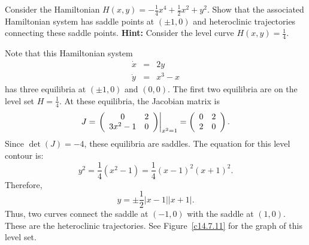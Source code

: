 \documentclass{ximera}
\begin{document}
\begin{exercise} \label{c14.7.11} 
Consider the Hamiltonian  $H(x,y) = -\frac{1}{4}x^4 + \frac{1}{2}x^2 + y^2$.  
Show that the associated Hamiltonian system has saddle points at $(\pm 1,0)$ 
and heteroclinic trajectories connecting these saddle points.  {\bf Hint:} 
Consider the level curve $H(x,y) = \frac{1}{4}$.

\begin{solution}

Note that this Hamiltonian system
\begin{eqnarray*}
\dot{x}& = & 2y\\
\dot{y} &  =&  x^3 -x
\end{eqnarray*}
has three equilibria at $(\pm 1,0)$ and $(0,0)$.  The first two equilibria
are on the level set $H= \frac{1}{4}$.  At these equilibria, the Jacobian
matrix is
\[
J = \left.\left(\begin{array}{cc} 0 & 2\\ 3x^2-1 &0\end{array}\right)\right|_{x^2=1} = 
\left(\begin{array}{cc} 0 & 2\\ 2 &0\end{array}\right).
\]
Since $\det(J)=-4$, these equilibria are saddles.
The equation for this level contour is: 
\[
y^2=\frac{1}{4}(x^2-1)=\frac{1}{4}(x-1)^2(x+1)^2.
\]
Therefore,
\[
y = \pm\frac{1}{2}|x-1||x+1|.
\]
Thus, two curves connect the saddle at $(-1,0)$ with the saddle at $(1,0)$.
These are the heteroclinic trajectories. See
Figure~\ref{c14.7.11} for the graph of this level set.

\begin{figure}[htb]
     \centerline{%
      }
\end{figure} 
 

\end{solution}
\end{exercise}
\end{document}

